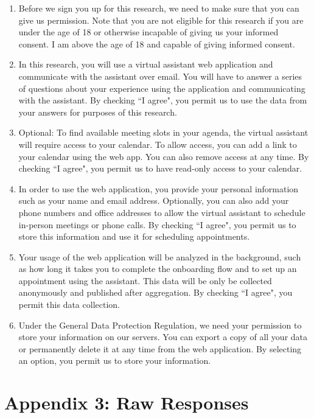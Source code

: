 \documentclass{article}
\begin{document}
\begin{enumerate}
	\item Before we sign you up for this research, we need to make sure that you can give us permission. Note that you are not eligible for this research if you are under the age of 18 or otherwise incapable of giving us your informed consent. I am above the age of 18 and capable of giving informed consent.
	\item In this research, you will use a virtual assistant web application and communicate with the assistant over email. You will have to answer a series of questions about your experience using the application and communicating with the assistant. By checking ``I agree", you permit us to use the data from your answers for purposes of this research.
	\item Optional: To find available meeting slots in your agenda, the virtual assistant will require access to your calendar. To allow access, you can add a link to your calendar using the web app. You can also remove access at any time. By checking ``I agree", you permit us to have read-only access to your calendar.
	\item In order to use the web application, you provide your personal information such as your name and email address. Optionally, you can also add your phone numbers and office addresses to allow the virtual assistant to schedule in-person meetings or phone calls. By checking ``I agree", you permit us to store this information and use it for scheduling appointments.
	\item Your usage of the web application will be analyzed in the background, such as how long it takes you to complete the onboarding flow and to set up an appointment using the assistant. This data will be only be collected anonymously and published after aggregation. By checking ``I agree", you permit this data collection.
	\item Under the General Data Protection Regulation, we need your permission to store your information on our servers. You can export a copy of all your data or permanently delete it at any time from the web application. By selecting an option, you permit us to store your information.
\end{enumerate}

\newpage

\section*{Appendix 3: Raw Responses}
\end{document}
